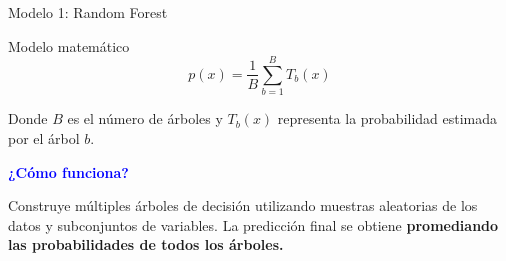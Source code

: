 \documentclass[12pt, aspectratio=43]{beamer}
\begin{document}

\begin{frame}{Modelo 1: Random Forest}

\begin{block}{Modelo matemático}
\[
\boxed{
p(x)=\frac{1}{B}\sum_{b=1}^{B}T_b(x)
}
\]

\small
Donde $B$ es el número de árboles y $T_b(x)$
representa la probabilidad estimada por el árbol $b$.
\end{block}

\pause

\textbf{\textcolor{blue}{¿Cómo funciona?}}

\justifying
Construye múltiples árboles de decisión utilizando muestras aleatorias de los datos y subconjuntos de variables. La predicción final se obtiene \textbf{promediando las probabilidades de todos los árboles.}

\vspace{0.3cm}


\end{frame}
\end{document}

